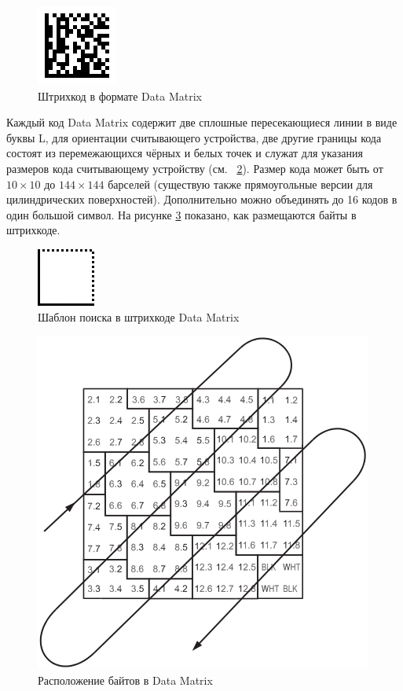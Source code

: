 \begin{figure}[htb]
    \centering
    \includegraphics{img/dm_sample}
    \caption{Штрихкод в формате Data Matrix}
    \label{fig:dmSample}
\end{figure}

Каждый код Data Matrix содержит две сплошные пересекающиеся линии в 
виде буквы L, для ориентации считывающего устройства, две другие 
границы кода состоят из перемежающихся чёрных и белых точек и служат для 
указания размеров кода считывающему устройству 
(см. \figurename\ \ref{fig:dmPattern}). Размер кода может быть от
$10 \times 10$ до $144 \times 144$ барселей (существую также 
прямоугольные версии для цилиндрических поверхностей). Дополнительно
можно объединять до 16 кодов в один большой символ.
На рисунке \ref{fig:dmCoding} показано,
как размещаются байты в штрихкоде.

\begin{figure}[htb]
    \centering
    \includegraphics{img/dm_pattern}
    \caption{Шаблон поиска в штрихкоде Data Matrix}
    \label{fig:dmPattern}
\end{figure}

\begin{figure}[htb]
    \centering
    \includegraphics[scale=0.8]{img/dm_coding}
    \caption{Расположение байтов в Data Matrix}
    \label{fig:dmCoding}
\end{figure}

